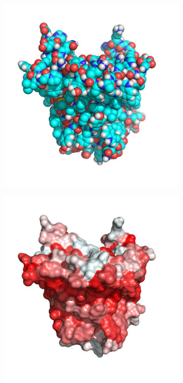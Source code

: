 \begin{figure}
\begin{subfigure}{.5\textwidth}
    \label{Fig:cartoon_representation}
  \caption{}
  \end{subfigure}%
  \\[\baselineskip]
  \begin{subfigure}{.5\textwidth}
  \centering
  {\includegraphics[width=0.9\linewidth]{./figures/ch1/vdw_representation}}
  \caption{}
    \label{Fig:vdw_representation}
  \end{subfigure}%
  \begin{subfigure}{.5\textwidth}
  \centering
  {\includegraphics[width=0.9\linewidth]{./figures/ch1/surface_representation}}

\end{subfigure}
\end{figure}
